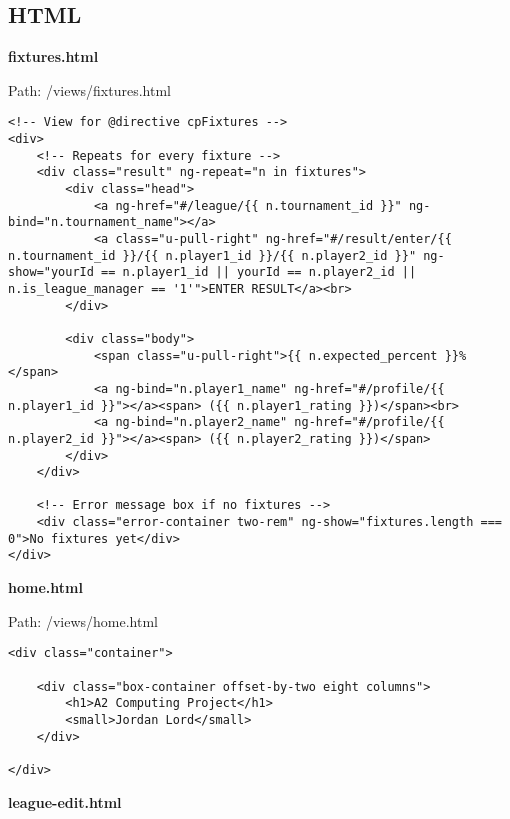 \subsection{HTML}
\textbf{fixtures.html}\label{fixtures.html}

Path: /views/fixtures.html
{\scriptsize
\begin{lstlisting}
<!-- View for @directive cpFixtures -->
<div>
	<!-- Repeats for every fixture -->
	<div class="result" ng-repeat="n in fixtures">
		<div class="head">
			<a ng-href="#/league/{{ n.tournament_id }}" ng-bind="n.tournament_name"></a>
			<a class="u-pull-right" ng-href="#/result/enter/{{ n.tournament_id }}/{{ n.player1_id }}/{{ n.player2_id }}" ng-show="yourId == n.player1_id || yourId == n.player2_id || n.is_league_manager == '1'">ENTER RESULT</a><br>
		</div>

		<div class="body">
			<span class="u-pull-right">{{ n.expected_percent }}%</span>
			<a ng-bind="n.player1_name" ng-href="#/profile/{{ n.player1_id }}"></a><span> ({{ n.player1_rating }})</span><br>
			<a ng-bind="n.player2_name" ng-href="#/profile/{{ n.player2_id }}"></a><span> ({{ n.player2_rating }})</span>
		</div>
	</div>

	<!-- Error message box if no fixtures -->
	<div class="error-container two-rem" ng-show="fixtures.length === 0">No fixtures yet</div>
</div>\end{lstlisting}
}
\textbf{home.html}\label{home.html}

Path: /views/home.html
{\scriptsize
\begin{lstlisting}
<div class="container">

	<div class="box-container offset-by-two eight columns">
		<h1>A2 Computing Project</h1>
		<small>Jordan Lord</small>
	</div>

</div>\end{lstlisting}
}
\textbf{league-edit.html}\label{league-edit.html}


